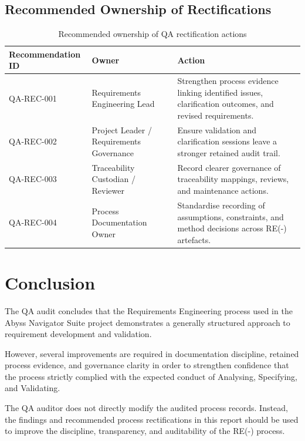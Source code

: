 \documentclass[11pt,a4paper]{article}
\begin{document}
\subsection{Recommended Ownership of Rectifications}

\begin{table}[H]
\centering
\small
\renewcommand{\arraystretch}{1.4}
\begin{tabularx}{\textwidth}{|p{}|p{}|X|}
\hline
\rowcolor{tableheader}
\textbf{Recommendation ID} & \textbf{Owner} & \textbf{Action} \\
\hline
QA-REC-001 & Requirements Engineering Lead & Strengthen process evidence linking identified issues, clarification outcomes, and revised requirements. \\
\hline
QA-REC-002 & Project Leader / Requirements Governance & Ensure validation and clarification sessions leave a stronger retained audit trail. \\
\hline
QA-REC-003 & Traceability Custodian / Reviewer & Record clearer governance of traceability mappings, reviews, and maintenance actions. \\
\hline
QA-REC-004 & Process Documentation Owner & Standardise recording of assumptions, constraints, and method decisions across RE(-) artefacts. \\
\hline
\end{tabularx}
\caption{Recommended ownership of QA rectification actions}
\label{tab:qa-recommendations}
\end{table}


\section{Conclusion}

The QA audit concludes that the Requirements Engineering process used in the Abyss Navigator Suite project demonstrates a generally structured approach to requirement development and validation.

However, several improvements are required in documentation discipline, retained process evidence, and governance clarity in order to strengthen confidence that the process strictly complied with the expected conduct of Analysing, Specifying, and Validating.

The QA auditor does not directly modify the audited process records. Instead, the findings and recommended process rectifications in this report should be used to improve the discipline, transparency, and auditability of the RE(-) process.
\end{document}
